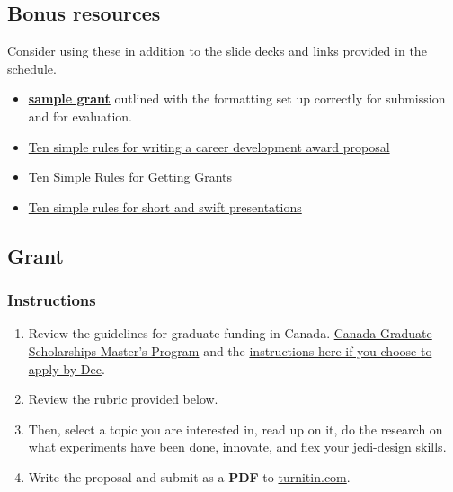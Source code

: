 \documentclass[
]{book}
\begin{document}
\hypertarget{bonus-resources}{%
\subsection*{Bonus resources}\label{bonus-resources}}

Consider using these in addition to the slide decks and links provided in the schedule.

\begin{itemize}
\item
  \href{https://figshare.com/articles/online_resource/BIOL3250_grant_template/13224755}{\textbf{sample grant}} outlined with the formatting set up correctly for submission and for evaluation.
\item
  \href{https://journals.plos.org/ploscompbiol/article?id=10.1371/journal.pcbi.1005863}{Ten simple rules for writing a career development award proposal}
\item
  \href{https://journals.plos.org/ploscompbiol/article?id=10.1371/journal.pcbi.0020012}{Ten Simple Rules for Getting Grants}
\item
  \href{https://journals.plos.org/ploscompbiol/article?id=10.1371/journal.pcbi.1005373}{Ten simple rules for short and swift presentations}
\end{itemize}

\hypertarget{grant-1}{%
\subsection*{Grant}\label{grant-1}}

\hypertarget{instructions-1}{%
\subsubsection*{Instructions}\label{instructions-1}}

\begin{enumerate}
\def\labelenumi{\arabic{enumi}.}
\item
  Review the guidelines for graduate funding in Canada. \href{http://www.nserc-crsng.gc.ca/students-etudiants/pg-cs/cgsm-bescm_eng.asp}{Canada Graduate Scholarships-Master's Program} and the \href{http://www.nserc-crsng.gc.ca/ResearchPortal-PortailDeRecherche/Instructions-Instructions/CGS_M-BESC_M_eng.asp}{instructions here if you choose to apply by Dec}.
\item
  Review the rubric provided below.
\item
  Then, select a topic you are interested in, read up on it, do the research on what experiments have been done, innovate, and flex your jedi-design skills.
\item
  Write the proposal and submit as a \textbf{PDF} to \href{http://www.turnitin.com}{turnitin.com}.
\end{enumerate}
\end{document}
